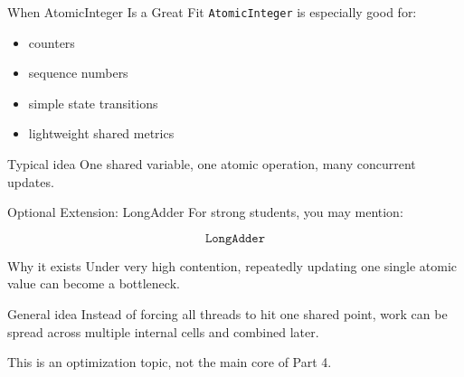 \documentclass[aspectratio=169,11pt]{beamer}
\begin{document}
	\begin{frame}{When AtomicInteger Is a Great Fit}
		\texttt{AtomicInteger} is especially good for:
		
		\begin{itemize}
			\item counters
			\item sequence numbers
			\item simple state transitions
			\item lightweight shared metrics
		\end{itemize}
		
		\vspace{0.35cm}
		
		\begin{exampleblock}{Typical idea}
			One shared variable, one atomic operation, many concurrent updates.
		\end{exampleblock}
	\end{frame}
	
	\begin{frame}{Optional Extension: LongAdder}
		For strong students, you may mention:
		
		\[
		\texttt{LongAdder}
		\]
		
		\vspace{0.35cm}
		
		\begin{block}{Why it exists}
			Under very high contention, repeatedly updating one single atomic value can become a bottleneck.
		\end{block}
		
		\vspace{0.3cm}
		
		\begin{exampleblock}{General idea}
			Instead of forcing all threads to hit one shared point, work can be spread across multiple internal cells and combined later.
		\end{exampleblock}
		
		\vspace{0.25cm}
		
		This is an optimization topic, not the main core of Part 4.
	\end{frame}
	
\end{document}
